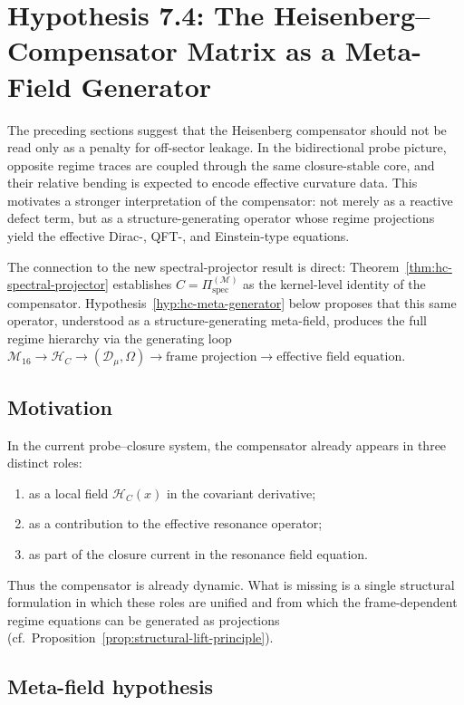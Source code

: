 \section{Hypothesis 7.4: The Heisenberg--Compensator Matrix as a Meta-Field Generator}
\label{sec:hc-meta-field-generator}

The preceding sections suggest that the Heisenberg compensator should not
be read only as a penalty for off-sector leakage. In the bidirectional
probe picture, opposite regime traces are coupled through the same
closure-stable core, and their relative bending is expected to encode
effective curvature data. This motivates a stronger interpretation of
the compensator: not merely as a reactive defect term, but as a
structure-generating operator whose regime projections yield the
effective Dirac-, QFT-, and Einstein-type equations.

The connection to the new spectral-projector result is direct:
Theorem~\ref{thm:hc-spectral-projector} establishes
$C = \Pi^{(\mathcal{M})}_{\mathrm{spec}}$ as the kernel-level identity
of the compensator. Hypothesis~\ref{hyp:hc-meta-generator} below
proposes that this same operator, understood as a structure-generating
meta-field, produces the full regime hierarchy via the generating loop
$\mathcal{M}_{16} \to \mathcal{H}_C \to (\mathcal{D}_\mu,\Omega) \to
\text{frame projection} \to \text{effective field equation}$.

\subsection*{Motivation}

In the current probe--closure system, the compensator already appears
in three distinct roles:
\begin{enumerate}[label=(\arabic*)]
 \item as a local field $\mathcal{H}_C(x)$ in the covariant derivative;
 \item as a contribution to the effective resonance operator;
 \item as part of the closure current in the resonance field equation.
\end{enumerate}
Thus the compensator is already dynamic. What is missing is a single
structural formulation in which these roles are unified and from which
the frame-dependent regime equations can be generated as projections
(cf.\ Proposition~\ref{prop:structural-lift-principle}).

\subsection*{Meta-field hypothesis}

